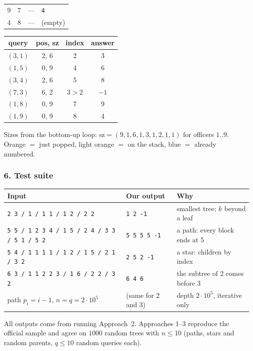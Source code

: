 \begin{tracebox}
\begin{center}
\begin{tabular}{@{}clll@{}}
9 & 7 & --- & \texttt{4} \\
4 & 8 & --- & (empty) \\
\bottomrule
\end{tabular}
\qquad
\begin{tabular}{@{}cccc@{}}
\toprule
\textbf{query} & \textbf{pos, sz} & \textbf{index} & \textbf{answer} \\
\midrule
$(3,1)$ & 2, 6 & 2 & 3 \\
$(1,5)$ & 0, 9 & 4 & 6 \\
$(3,4)$ & 2, 6 & 5 & 8 \\
$(7,3)$ & 6, 2 & $3 > 2$ & $-1$ \\
$(1,8)$ & 0, 9 & 7 & 9 \\
$(1,9)$ & 0, 9 & 8 & 4 \\
\bottomrule
\end{tabular}
\end{center}
Sizes from the bottom-up loop: $\mathrm{sz} = (9, 1, 6, 1, 3, 1, 2, 1, 1)$ for officers $1..9$. Orange $=$ just popped, light orange $=$ on the stack, blue $=$ already numbered.
\end{tracebox}

\subsubsection*{6. Test suite}

\begin{testbox}
\centering\small
\begin{tabular}{@{}p{6.6cm}lp{4.8cm}@{}}
\toprule
\textbf{Input} & \textbf{Our output} & \textbf{Why} \\
\midrule
\texttt{2 3 / 1 / 1 1 / 1 2 / 2 2} & \texttt{1 2 -1} & smallest tree; $k$ beyond a leaf \\
\texttt{5 5 / 1 2 3 4 / 1 5 / 2 4 / 3 3 / 5 1 / 5 2} & \texttt{5 5 5 5 -1} & a path: every block ends at 5 \\
\texttt{5 4 / 1 1 1 1 / 1 2 / 1 5 / 2 1 / 3 2} & \texttt{2 5 2 -1} & a star: children by index \\
\texttt{6 3 / 1 1 2 2 3 / 1 6 / 2 2 / 3 2} & \texttt{6 4 6} & the subtree of 2 comes before 3 \\
path $p_i = i-1$, $n = q = 2\cdot10^5$ & (same for 2 and 3) & depth $2\cdot10^5$, iterative only \\
\bottomrule
\end{tabular}
\end{testbox}
All outputs come from running Approach~2. Approaches 1--3 reproduce the official sample and agree on $1000$ random trees with $n \le 10$ (paths, stars and random parents, $q \le 10$ random queries each).

